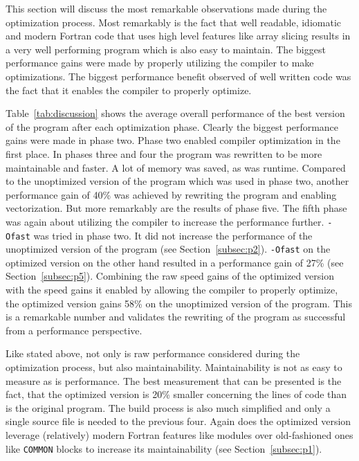 \documentclass[twoside,11pt]{article}
\begin{document}
This section will discuss the most remarkable observations made during
the optimization process.
Most remarkably is the fact that well readable, idiomatic and modern
Fortran code that uses high level features like array slicing results
in a very well performing program which is also easy to maintain.
The biggest performance gains were made by properly utilizing the
compiler to make optimizations.
The biggest performance benefit observed of well written code
was the fact that it enables the compiler to properly optimize.

Table~\ref{tab:discussion} shows the average overall performance of
the best version of the program after each optimization phase.
Clearly the biggest performance gains were made in phase two.
Phase two enabled compiler optimization in the first place.
In phases three and four the program was rewritten to be more
maintainable and faster.
A lot of memory was saved, as was runtime.
Compared to the unoptimized version of the program which was used in
phase two, another performance gain of 40\% was achieved by rewriting
the program and enabling vectorization.
But more remarkably are the results of phase five.
The fifth phase was again about utilizing the compiler to increase
the performance further.
\texttt{-Ofast} was tried in phase two.
It did not increase the performance of the unoptimized version of the
program (see Section~\ref{subsec:p2}).
\texttt{-Ofast} on the optimized version on the other hand resulted in
a performance gain of 27\% (see Section~\ref{subsec:p5}).
Combining the raw speed gains of the optimized version with the
speed gains it enabled by allowing the compiler to properly optimize,
the optimized version gains 58\% on the unoptimized version of the
program.
This is a remarkable number and validates the rewriting of the program
as successful from a performance perspective.

Like stated above, not only is raw performance considered during the
optimization process, but also maintainability.
Maintainability is not as easy to measure as is performance.
The best measurement that can be presented is the fact, that the
optimized version is 20\% smaller concerning the lines of code than
is the original program.
The build process is also much simplified and only a single source
file is needed to the previous four.
Again does the optimized version leverage (relatively) modern Fortran
features like modules over old-fashioned ones like \texttt{COMMON}
blocks to increase its maintainability (see Section~\ref{subsec:p1}).
\end{document}
